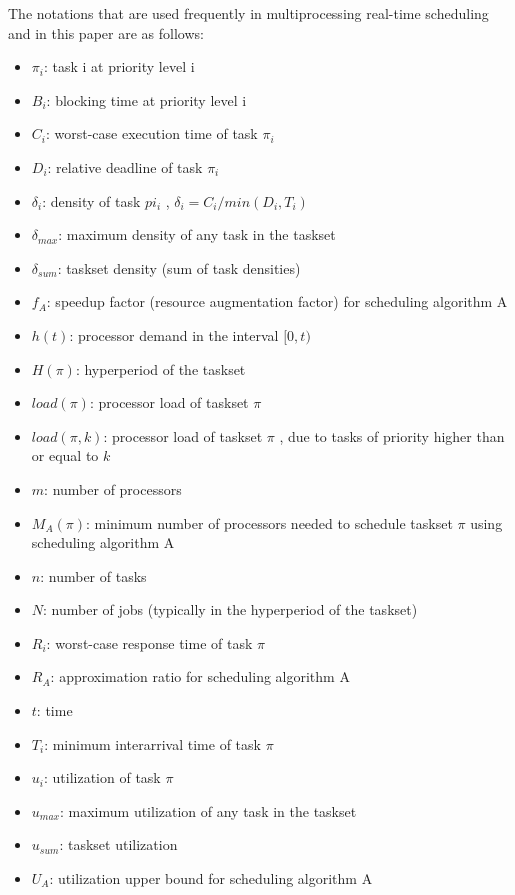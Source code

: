 \documentclass[preprint,12pt]{elsarticle}
\begin{document}
The notations that are used frequently in multiprocessing real-time scheduling and in this paper are as follows\cite{davis2011survey}:

\begin{itemize}
\item $\pi_i$: task i at priority level i
\item $B_i$: blocking time at priority level i
\item $C_i$: worst-case execution time of task $\pi_i$
\item $D_i$: relative deadline of task $\pi_i$
\item $\delta_i$: density of task $pi_i$ , $\delta_i = C_i/ min(D_i , T_i )$
\item $\delta_{max}$: maximum density of any task in the taskset
\item $\delta_{sum}$: taskset density (sum of task densities)
\item $f_A$: speedup factor (resource augmentation factor) for scheduling algorithm A
\item $h(t)$: processor demand in the interval $[0,t)$
\item $H(\pi)$: hyperperiod of the taskset
\item $load(\pi)$: processor load of taskset $\pi$
\item $load(\pi, k)$: processor load of taskset $\pi$ , due to tasks of priority higher than or equal to $k$
\item $m$: number of processors
\item $M_A(\pi)$: minimum number of processors needed to schedule taskset $\pi$ using scheduling algorithm A
\item $n$: number of tasks
\item $N$: number of jobs (typically in the hyperperiod of the taskset)
\item $R_i$: worst-case response time of task $\pi$
\item $R_A$: approximation ratio for scheduling algorithm A
\item $t$: time
\item $T_i$: minimum interarrival time of task $\pi$
\item $u_i$: utilization of task $\pi$
\item $u_{max}$: maximum utilization of any task in the taskset
\item $u_{sum}$: taskset utilization
\item $U_A$: utilization upper bound for scheduling algorithm A
\end{itemize}
\end{document}
